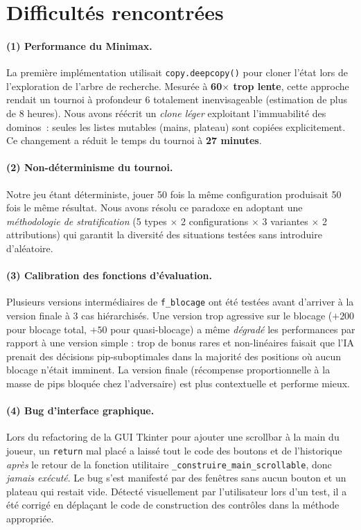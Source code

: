 \documentclass[11pt,a4paper]{article}
\begin{document}
\section{Difficultés rencontrées}\label{sec:difficultes}

\paragraph{(1) Performance du Minimax.} La première implémentation utilisait
\texttt{copy.deepcopy()} pour cloner l'état lors de l'exploration de l'arbre de
recherche. Mesurée à \textbf{60$\times$ trop lente}, cette approche rendait un
tournoi à profondeur 6 totalement inenvisageable (estimation de plus de 8 heures).
Nous avons réécrit un \emph{clone léger} exploitant l'immuabilité des dominos~:
seules les listes mutables (mains, plateau) sont copiées explicitement. Ce
changement a réduit le temps du tournoi à \textbf{27 minutes}.

\paragraph{(2) Non-déterminisme du tournoi.} Notre jeu étant déterministe, jouer
50 fois la même configuration produisait 50 fois le même résultat. Nous avons
résolu ce paradoxe en adoptant une \emph{méthodologie de stratification}
(5 types $\times$ 2 configurations $\times$ 3 variantes $\times$ 2 attributions) qui
garantit la diversité des situations testées sans introduire d'aléatoire.

\paragraph{(3) Calibration des fonctions d'évaluation.} Plusieurs versions
intermédiaires de \texttt{f\_blocage} ont été testées avant d'arriver à la version
finale à 3 cas hiérarchisés. Une version trop agressive sur le blocage
(\(+200\) pour blocage total, \(+50\) pour quasi-blocage) a même \emph{dégradé}
les performances par rapport à une version simple : trop de bonus rares et
non-linéaires faisait que l'IA prenait des décisions pip-suboptimales dans la
majorité des positions où aucun blocage n'était imminent. La version finale
(récompense proportionnelle à la masse de pips bloquée chez l'adversaire) est plus
contextuelle et performe mieux.

\paragraph{(4) Bug d'interface graphique.} Lors du refactoring de la GUI Tkinter
pour ajouter une scrollbar à la main du joueur, un \texttt{return} mal placé a
laissé tout le code des boutons et de l'historique \emph{après} le retour de la
fonction utilitaire \texttt{\_construire\_main\_scrollable}, donc \emph{jamais
exécuté}. Le bug s'est manifesté par des fenêtres sans aucun bouton et un plateau
qui restait vide. Détecté visuellement par l'utilisateur lors d'un test, il a été
corrigé en déplaçant le code de construction des contrôles dans la méthode
appropriée.
\end{document}
